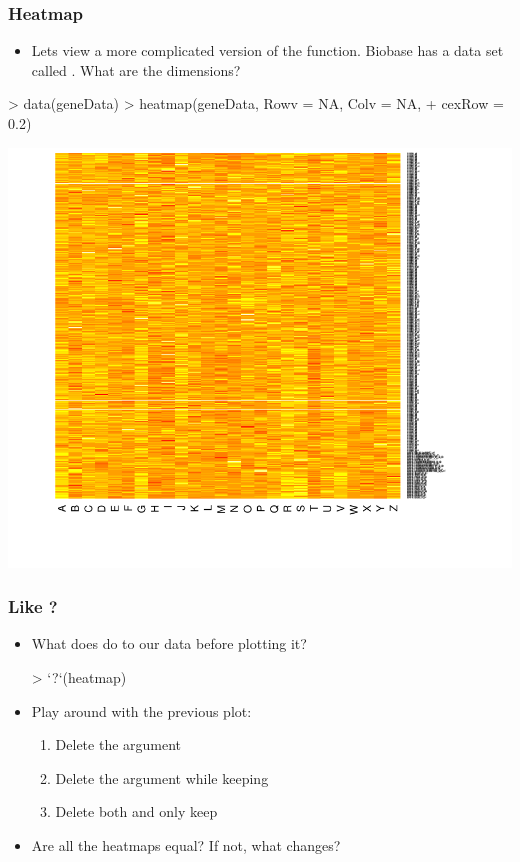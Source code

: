 \begin{frame}
  \frametitle{Heatmap}
  \begin{itemize}
  \item Lets view a more complicated version of the  function. Biobase has a data set called . What are the dimensions?
  \end{itemize}
\begin{Schunk}
\begin{Sinput}
> data(geneData)
> heatmap(geneData, Rowv = NA, Colv = NA, 
+     cexRow = 0.2)
\end{Sinput}
\end{Schunk}
\includegraphics{plots/fig-006}
\end{frame}

\begin{frame}
  \frametitle{Like ?}
  \begin{itemize}
  \item What does  do to our data before plotting it? 
\begin{Schunk}
\begin{Sinput}
> `?`(heatmap)
\end{Sinput}
\end{Schunk}
  \item Play around with the previous plot:
  \begin{enumerate}
  \item Delete the  argument
  \item Delete the  argument while keeping 
  \item Delete both and only keep 
  \end{enumerate} 
  \item Are all the heatmaps equal? If not, what changes?
  \end{itemize}
\end{frame}

